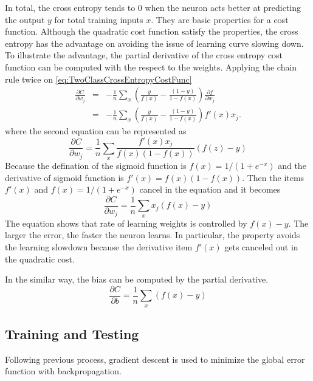 In total, the cross entropy tends to $0$ when the neuron acts better at predicting the output $y$ for total training inputs $x$. They are basic properties for a cost function. Although the quadratic cost function satisfy the properties, the cross entropy has the advantage on avoiding the issue of learning curve slowing down. To illustrate the advantage, the partial derivative of the cross entropy cost function can be computed with the respect to the weights. Applying the chain rule twice on \ref{eq:TwoClassCrossEntropyCostFunc}
\begin{eqnarray}\label{eq:DerCrossEntropyCostFunc}
  \frac{\partial C}{\partial w_j} & = & -\frac{1}{n} \sum_x \left(
    \frac{y }{f(x)} -\frac{(1-y)}{1-f(x)} \right)
  \frac{\partial f}{\partial w_j} \\
 & = & -\frac{1}{n} \sum_x \left( 
    \frac{y}{f(x)}-\frac{(1-y)}{1-f(x)} \right)f'(x) x_j.
\end{eqnarray}
where the second equation can be represented as
\begin{equation}\label{eq:SecondDerCrossEntropyCostFunc}
  \frac{\partial C}{\partial w_j} = \frac{1}{n}  \sum_x \frac{f'(x) x_j}{f(x) (1-f(x))} (f(z)-y)
\end{equation}
Because the defination of the sigmoid function is $f(x) =1/(1+e^{-x})$ and the derivative of sigmoid function is $f'(x) =f(x)(1-f(x))$. Then the items $f'(x)$ and $f(x) =1/(1+e^{-x})$ cancel in the equation and it becomes
\begin{equation}\label{eq:SimDerCrossEntropyCostFunc}
 \frac{\partial C}{\partial w_j} =  \frac{1}{n} \sum_x x_j(f(x)-y)
\end{equation}
The equation shows that rate of learning weights is controlled by $f(x) - y$. The larger the error, the faster the neuron learns. In particular, the property avoids the learning slowdown because the derivative item $f'(x)$ gets canceled out in the quadratic cost.

In the similar way, the bias can be computed by the partial derivative.
\begin{equation}\label{eq:BiasCrossEntropyCostFunc}
\frac{\partial C}{\partial b} = \frac{1}{n} \sum_x (f(x)-y)
\end{equation}


\subsection{Training and Testing}

Following previous process, gradient descent is used to minimize the global error function with backpropagation. 

